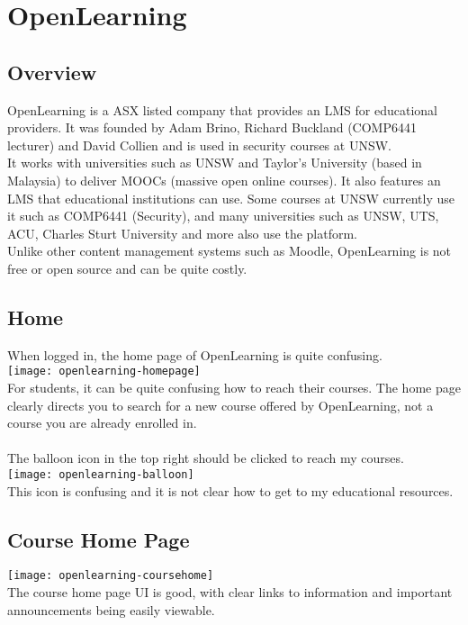 
\section{OpenLearning}
\subsection{Overview}
OpenLearning is a ASX listed company that provides an LMS for educational providers. It was founded by Adam Brino, Richard Buckland (COMP6441 lecturer) and David Collien and is used in security courses at UNSW.\\
It works with universities such as UNSW and Taylor's University (based in Malaysia) to deliver MOOCs (massive open online courses). It also features an LMS that educational institutions can use. Some courses at UNSW currently use it such as COMP6441 (Security), and many universities such as UNSW, UTS, ACU, Charles Sturt University and more also use the platform.\\
Unlike other content management systems such as Moodle, OpenLearning is not free or open source and can be quite costly.\\

\subsection{Home}
When logged in, the home page of OpenLearning is quite confusing.\\
\texttt{[image: openlearning-homepage]} \\
For students, it can be quite confusing how to reach their courses. The home page clearly directs you to search for a new course offered by OpenLearning, not a course you are already enrolled in. \\
\\
The balloon icon in the top right should be clicked to reach my courses. \\
\texttt{[image: openlearning-balloon]} \\
This icon is confusing and it is not clear how to get to my educational resources. \\

\subsection{Course Home Page}
\texttt{[image: openlearning-coursehome]} \\
The course home page UI is good, with clear links to information and important announcements being easily viewable.\\

